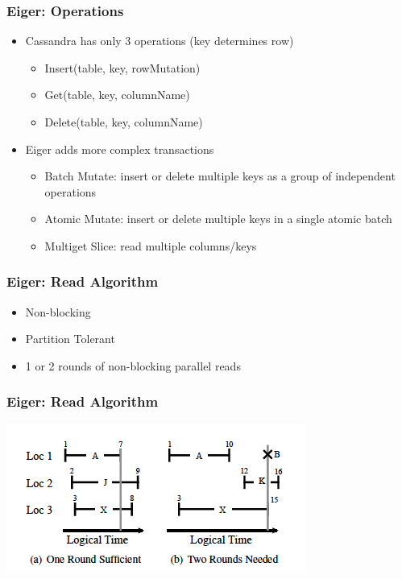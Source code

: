 \documentclass{beamer}
\begin{document}
\begin{frame}
\frametitle{Eiger: Operations}
\begin{itemize}
\pause \item Cassandra has only 3 operations (key determines row)
	\begin{itemize}
		\item Insert(table, key, rowMutation)
		\item Get(table, key, columnName)
		\item Delete(table, key, columnName)
	\end{itemize}
\pause \item Eiger adds more complex transactions
	\begin{itemize}
		\item Batch Mutate: insert or delete multiple keys as a group of independent operations
		\item Atomic Mutate: insert or delete multiple keys in a single atomic batch
		\item Multiget Slice: read multiple columns/keys
	\end{itemize}	
\end{itemize}  
\end{frame}

\begin{frame}
\frametitle{Eiger: Read Algorithm}
\begin{itemize}
\item Non-blocking
\item Partition Tolerant
\item 1 or 2 rounds of non-blocking parallel reads
\end{itemize}  
\end{frame}

\begin{frame}
\frametitle{Eiger: Read Algorithm}
\includegraphics[scale=0.80]{Figure_Read.png}
\end{frame}
\end{document}
